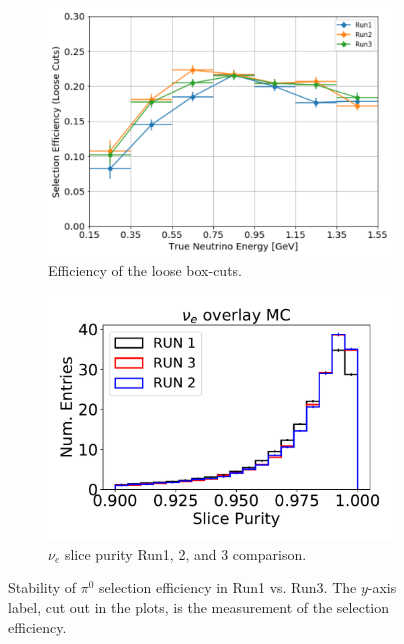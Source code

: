 \documentclass[a4paper]{article}
\begin{document}
\begin{figure}[H] 
\begin{center}
    \begin{subfigure}[b]{0.42\textwidth}
    \centering
    \includegraphics[width=1.00\textwidth]{stability/nueeff.png}
    \caption{\label{fig:stability:nueeff} Efficiency of the loose box-cuts.}
    \end{subfigure}
    \begin{subfigure}[b]{0.47\textwidth}
    \centering
    \includegraphics[width=1.00\textwidth]{stability/slpur_03122020_RUN1RUN3_nue.pdf}
    \caption{\label{fig:stability:slpurity} $\nu_e$ slice purity Run1, 2, and 3 comparison.}
    \end{subfigure}
\caption{\label{fig:stability:pi0eff}Stability of $\pi^0$ selection efficiency in Run1 vs. Run3. The $y$-axis label, cut out in the plots, is the measurement of the selection efficiency.}
\end{center}
\end{figure}
\end{document}
